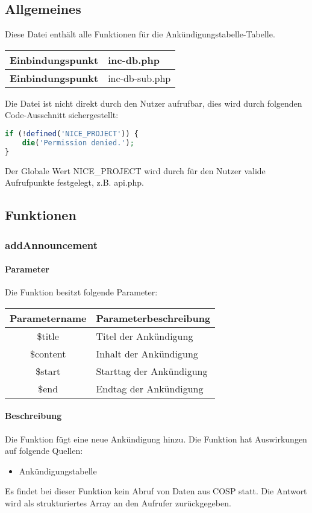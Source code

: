 \subsection{Allgemeines} Diese Datei enthält alle Funktionen für die Ankündigungstabelle-Tabelle.
\begin{table}[H]
	\begin{tabular}{|c|p{11cm}|}
		\hline
		\textbf{Einbindungspunkt} & inc-db.php \\ \hline
		\textbf{Einbindungspunkt} & inc-db-sub.php \\ \hline
	\end{tabular}
\end{table}
Die Datei ist nicht direkt durch den Nutzer aufrufbar, dies wird durch folgenden Code-Ausschnitt sichergestellt:
\begin{lstlisting}[language=php]
if (!defined('NICE_PROJECT')) {
	die('Permission denied.');
}
\end{lstlisting}
Der Globale Wert {\glqq NICE\_PROJECT\grqq} wird durch für den Nutzer valide Aufrufpunkte festgelegt, z.B. {\glqq api.php\grqq}.
\newpage
\subsection{Funktionen}
\subsubsection{addAnnouncement}
\paragraph{Parameter} Die Funktion besitzt folgende Parameter:
\begin{table}[H]
	\begin{tabular}{|c|p{11cm}|}
		\hline
		\textbf{Parametername} & \textbf{Parameterbeschreibung} \\ \hline
		\$title & Titel der Ankündigung \\ \hline
		\$content & Inhalt der Ankündigung \\ \hline
		\$start & Starttag der Ankündigung \\ \hline
		\$end & Endtag der Ankündigung \\ \hline
	\end{tabular}
\end{table}
\paragraph{Beschreibung} Die Funktion fügt eine neue Ankündigung hinzu. Die Funktion hat Auswirkungen auf folgende Quellen:
\begin{itemize}
	\item Ankündigungstabelle
\end{itemize}
Es findet bei dieser Funktion kein Abruf von Daten aus {\glqq COSP\grqq} statt. Die Antwort wird als strukturiertes Array an den Aufrufer zurückgegeben.
